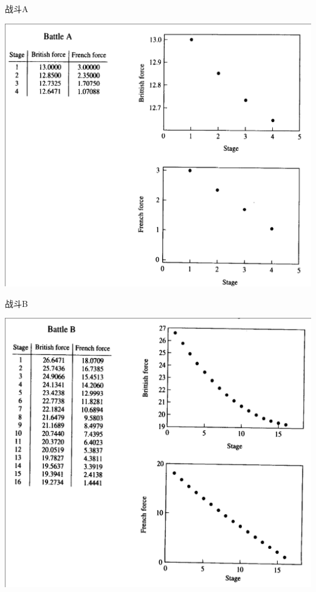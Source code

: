 \documentclass{beamer}
\begin{document}
\begin{frame}{战斗A}
  \begin{center}
    \includegraphics[height=.9\textheight{}]{fight-A.png}
  \end{center}  
\end{frame}

\begin{frame}{战斗B}
  \begin{center}
    \includegraphics[height=.9\textheight{}]{fight-B.png}
  \end{center}  
\end{frame}
\end{document}
